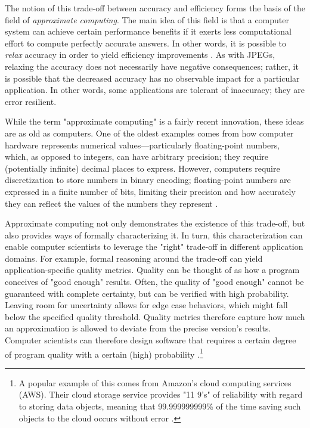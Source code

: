 \documentclass[sigplan,screen]{acmart}
\begin{document}
The notion of this trade-off between accuracy and efficiency forms the basis of the field of \emph{approximate computing}. The main idea of this field is that a computer system can achieve certain performance benefits if it exerts less computational effort to compute perfectly accurate answers. In other words, it is possible to \emph{relax} accuracy in order to yield efficiency improvements \cite{moreau2018taxonomy, mittal2016apsurvey, sampson2015thesis}. As with JPEGs, relaxing the accuracy does not necessarily have negative consequences; rather, it is possible that the decreased accuracy has no observable impact for a particular application. In other words, some applications are tolerant of inaccuracy; they are error resilient.

While the term "approximate computing" is a fairly recent innovation, these ideas are as old as computers. One of the oldest examples comes from how computer hardware represents numerical values---particularly floating-point numbers, which, as opposed to integers, can have arbitrary precision; they require (potentially infinite) decimal places to express. However, computers require discretization to store numbers in binary encoding; floating-point numbers are expressed in a finite number of bits, limiting their precision and how accurately they can reflect the values of the numbers they represent \cite{moreau2018taxonomy, friedman1996bias}.

Approximate computing not only demonstrates the existence of this trade-off, but also provides ways of formally characterizing it. In turn, this characterization can enable computer scientists to leverage the "right" trade-off in different application domains. For example, formal reasoning around the trade-off can yield application-specific quality metrics. Quality can be thought of as how a program conceives of "good enough" results. Often, the quality of "good enough" cannot be guaranteed with complete certainty, but can be verified with high probability. Leaving room for uncertainty  allows for edge case behaviors, which might fall below the specified quality threshold. Quality metrics therefore capture how much an approximation is allowed to deviate from the precise version's results. Computer scientists can therefore design software that requires a certain degree of program quality with a certain (high) probability \cite{sampson2015thesis}.\footnote{A popular example of this comes from Amazon's cloud computing services (AWS). Their cloud storage service provides "11 9's" of reliability with regard to storing data objects, meaning that 99.999999999\% of the time saving such objects to the cloud occurs without error \cite{amazon2020s3}.}
\end{document}
